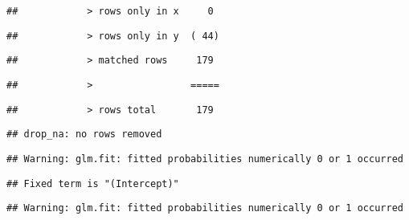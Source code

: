\documentclass[
]{article}
\begin{document}
\begin{verbatim}
##            > rows only in x     0
\end{verbatim}

\begin{verbatim}
##            > rows only in y  ( 44)
\end{verbatim}

\begin{verbatim}
##            > matched rows     179
\end{verbatim}

\begin{verbatim}
##            >                 =====
\end{verbatim}

\begin{verbatim}
##            > rows total       179
\end{verbatim}

\begin{verbatim}
## drop_na: no rows removed
\end{verbatim}

\begin{verbatim}
## Warning: glm.fit: fitted probabilities numerically 0 or 1 occurred
\end{verbatim}

\begin{verbatim}
## Fixed term is "(Intercept)"
\end{verbatim}

\begin{verbatim}
## Warning: glm.fit: fitted probabilities numerically 0 or 1 occurred
\end{verbatim}
\end{document}
